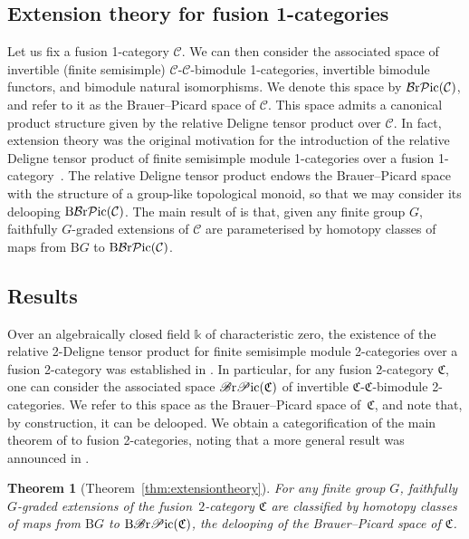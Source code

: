 \documentclass[10pt,a4paper]{amsart}
\newtheorem*{Theorem*}{Theorem}
\numberwithin{equation}{section}
\begin{document}
\subsection{Extension theory for fusion 1-categories}

Let us fix a fusion 1-category $\mathcal{C}$. We can then consider the associated space of invertible (finite semisimple) $\mathcal{C}$-$\mathcal{C}$-bimodule 1-categories, invertible bimodule functors, and bimodule natural isomorphisms. We denote this space by $\mathcal{B}{\rm r}\mathcal{P}{\rm ic}(\mathcal{C})$, and refer to it as the Brauer--Picard space of $\mathcal{C}$. This space admits a canonical product structure given by the relative Deligne tensor product over $\mathcal{C}$. In fact, extension theory was the original motivation for the introduction of the relative Deligne tensor product of finite semisimple module 1-categories over a fusion 1-category~\cite{ENO2}. The relative Deligne tensor product endows the Brauer--Picard space with the structure of a group-like topological monoid, so that we may consider its delooping $\mathrm{B}\mathcal{B}{\rm r}\mathcal{P}{\rm ic}(\mathcal{C})$. The main result of \cite{ENO2} is that, given any finite group $G$, faithfully $G$-graded extensions of $\mathcal{C}$ are parameterised by homotopy classes of maps from $\mathrm{B}G$ to $\mathrm{B}\mathcal{B}{\rm r}\mathcal{P}{\rm ic}(\mathcal{C})$.

\subsection{Results}

Over an algebraically closed field $\mathds{k}$ of characteristic zero, the existence of the relative 2-Deligne tensor product for finite semisimple module 2-categories over a fusion 2-category was established in \cite{D10}. In particular, for any fusion 2-category $\mathfrak{C}$, one can consider the associated space $\mathscr{B}{\rm r}\mathscr{P}{\rm ic}(\mathfrak{C})$ of invertible $\mathfrak{C}$-$\mathfrak{C}$-bimodule 2-categories. We refer to this space as the Brauer--Picard space of~$\mathfrak{C}$, and note that, by construction, it can be delooped. We obtain a categorification of the main theorem of \cite{ENO2} to fusion 2-categories, noting that a more general result was announced in \cite{JFR3}.

\begin{Theorem*}[Theorem~\ref{thm:extensiontheory}]
For any finite group $G$, faithfully $G$-graded extensions of the fusion~$2$-category $\mathfrak{C}$ are classified by homotopy classes of maps from $\mathrm{B}G$ to $\mathrm{B}\mathscr{B}{\rm r}\mathscr{P}{\rm ic}(\mathfrak{C})$, the delooping of the Brauer--Picard space of $\mathfrak{C}$.
\end{Theorem*}
\end{document}
